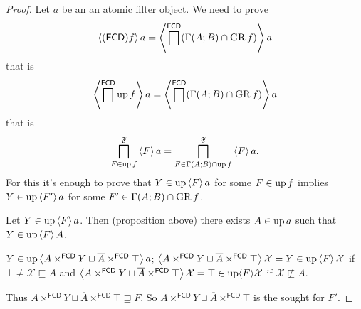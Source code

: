 \begin{proof}
Let $a$ be an an atomic filter object. We need to prove 
\[
\left\langle (\mathsf{FCD}) f\right\rangle a=\left\langle \bigsqcap^{\mathsf{FCD}}(\Gamma(A;B)\cap\operatorname{GR} f)\right\rangle a
\]
that is 
\[
\left\langle \bigsqcap^{\mathsf{FCD}}\operatorname{up} f\right\rangle a=\left\langle \bigsqcap^{\mathsf{FCD}}(\Gamma(A;B)\cap\operatorname{GR} f)\right\rangle a
\]
that is 
\[
\bigsqcap_{F\in\operatorname{up} f}^{\mathfrak{F}}\left\langle F\right\rangle a=\bigsqcap_{F\in\Gamma(A;B)\cap\operatorname{up} f}^{\mathfrak{F}}\left\langle F\right\rangle a.
\]
For this it's enough to prove that $Y\in\operatorname{up}\left\langle F\right\rangle a$ for some $F\in\operatorname{up} f$
implies $Y\in\operatorname{up}\left\langle F'\right\rangle a$ for some $F'\in\Gamma(A;B)\cap\operatorname{GR} f$.

Let $Y\in\operatorname{up}\left\langle F\right\rangle a$. Then (proposition above) there exists $A\in\operatorname{up} a$
such that $Y\in\operatorname{up}\left\langle F\right\rangle A$.

$Y\in\operatorname{up}\left\langle A\times^{\mathsf{FCD}}Y\sqcup\overline{A}\times^{\mathsf{FCD}}\top\right\rangle a$;
$\left\langle A\times^{\mathsf{FCD}}Y\sqcup\overline{A}\times^{\mathsf{FCD}}\top\right\rangle\mathcal{X}=Y\in\operatorname{up}\left\langle F\right\rangle\mathcal{X}$
if $\bot\neq\mathcal{X}\sqsubseteq A$ and $\left\langle A\times^{\mathsf{FCD}}Y\sqcup\overline{A}\times^{\mathsf{FCD}}\top\right\rangle\mathcal{X}=\top\in\operatorname{up}\langle F\rangle\mathcal{X}$
if $\mathcal{X}\nsqsubseteq A$.

Thus $A\times^{\mathsf{FCD}}Y\sqcup\overline{A}\times^{\mathsf{FCD}}\top\sqsupseteq F$.
So $A\times^{\mathsf{FCD}}Y\sqcup\overline{A}\times^{\mathsf{FCD}}\top$
is the sought for $F'$.
\end{proof}

